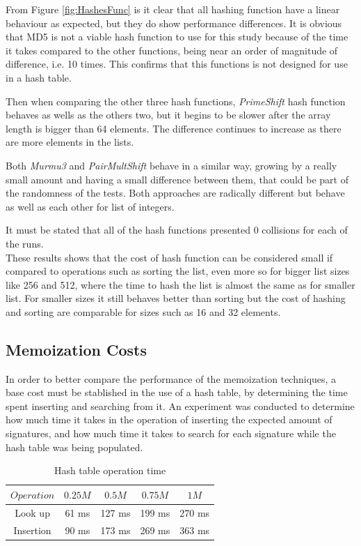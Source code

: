 \documentclass[a4paper,12pt]{article}
\begin{document}
From Figure \ref{fig:HashesFunc} is it clear that all hashing function have a linear behaviour as expected, but they do show performance differences. It is obvious that MD5 is not a viable hash function to use for this study because of the time it takes compared to the other functions, being near an order of magnitude of difference, i.e. 10 times. This confirms that this functions is not designed for use in a hash table.

Then when comparing the other three hash functions, {\it PrimeShift} hash function behaves as wells as the others two, but it begins to be slower after the array length is bigger than 64 elements. The difference continues to increase as there are more elements in the lists.

Both {\it Murmu3} and {\it PairMultShift} behave in a similar way, growing by a really small amount and having a small difference between them, that could be part of the randomness of the tests. Both approaches are radically different but behave as well as each other for list of integers.

It must be stated that all of the hash functions presented 0 collisions for each of the runs.\\

These results shows that the cost of hash function can be considered small if compared to operations such as sorting the list, even more so for bigger list sizes like 256 and 512, where the time to hash the list is almost the same as for smaller list. For smaller sizes it still behaves better than sorting but the cost of hashing and sorting are comparable for sizes such as 16 and 32 elements.

\subsection{Memoization Costs}

In order to better compare the performance of the memoization techniques, a base cost must be stablished in the use of a hash table, by determining the time spent inserting and searching from it. An experiment was conducted to determine how much time it takes in the operation of inserting the expected amount of signatures, and how much time it takes to search for each signature while the hash table was being populated. \\

\begin{table}[H]
\centering
\begin{tabular}{|c|c|c|c|c|}   \hline
	{$Operation$} & {$0.25M$} & {$0.5M$} & {$0.75M$} & {$1M$} \\  \hline
	Look up & 61 ms & 127 ms& 199 ms & 270 ms\\ 
	Insertion & 90 ms & 173 ms& 269 ms& 363 ms\\  \hline
\end{tabular}
\caption{Hash table operation time}
\label{ref:MemCostTable}
\end{table}
\end{document}
